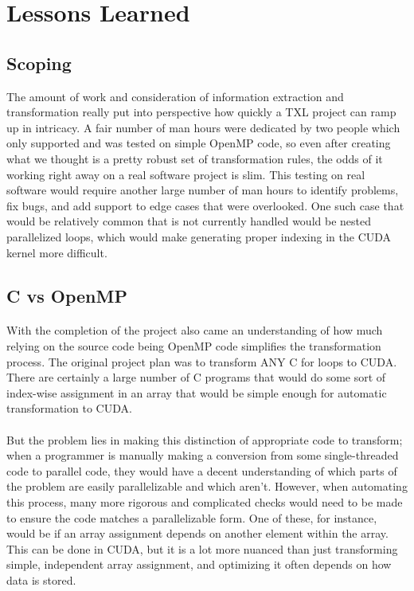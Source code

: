 \documentclass{article}
\begin{document}
\section{Lessons Learned}
\subsection{Scoping}
The amount of work and consideration of information extraction and transformation really put into perspective how quickly a TXL project can ramp up in intricacy. A fair number of man hours were dedicated by two people which only supported and was tested on simple OpenMP code, so even after creating what we thought is a pretty robust set of transformation rules, the odds of it working right away on a real software project is slim. This testing on real software would require another large number of man hours to identify problems, fix bugs, and add support to edge cases that were overlooked. One such case that would be relatively common that is not currently handled would be nested parallelized loops, which would make generating proper indexing in the CUDA kernel more difficult.

\subsection{C vs OpenMP}
\paragraph{}
With the completion of the project also came an understanding of how much relying on the source code being OpenMP code simplifies the transformation process. The original project plan was to transform ANY C for loops to CUDA. There are certainly a large number of C programs that would do some sort of index-wise assignment in an array that would be simple enough for automatic transformation to CUDA.

\paragraph{}
But the problem lies in making this distinction of appropriate code to transform; when a programmer is manually making a conversion from some single-threaded code to parallel code, they would have a decent understanding of which parts of the problem are easily parallelizable and which aren't. However, when automating this process, many more rigorous and complicated checks would need to be made to ensure the code matches a parallelizable form. One of these, for instance, would be if an array assignment depends on another element within the array. This can be done in CUDA, but it is a lot more nuanced than just transforming simple, independent array assignment, and optimizing it often depends on how data is stored.
\end{document}
